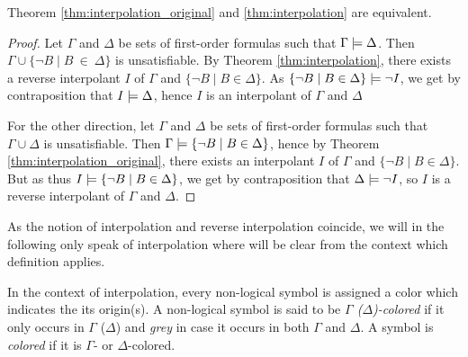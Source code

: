 \begin{prop}
	Theorem \ref{thm:interpolation_original} and \ref{thm:interpolation} are equivalent.
	\label{prop:interpolations_equivalent}
\end{prop}
\begin{proof}
	Let $\Gamma$ and $\Delta$ be sets of first-order formulas such that $ \Gamma \models \Delta$.
	Then $\Gamma \cup \{\lnot B \mid B~\in~\Delta\}$ is unsatisfiable.
	By Theorem \ref{thm:interpolation}, there exists a reverse interpolant $I$ of $\Gamma$ and $\{\lnot B \mid B \in \Delta\}$.
	As $\{\lnot B \mid B \in \Delta\} \models \lnot I$, we get by contraposition that $I \models \Delta$, hence $I$ is an interpolant of $\Gamma$ and $\Delta$

	For the other direction,
	let $\Gamma$ and $\Delta$ be sets of first-order formulas such that $ \Gamma \cup \Delta$ is unsatisfiable.
	Then $\Gamma \models \{\lnot B \mid B \in \Delta\}$, hence by Theorem \ref{thm:interpolation_original}, there exists an interpolant $I$ of $\Gamma$ and $\{\lnot B \mid B \in \Delta\}$.
	But as thus $ I\models \{\lnot B \mid B \in \Delta\}$, we get by contraposition that $\Delta \models \lnot I$, so $I$ is a reverse interpolant of $\Gamma$ and $\Delta$.
\end{proof}

As the notion of interpolation and reverse interpolation coincide, we will in the following only speak of interpolation where  will be clear from the context which definition applies.

In the context of interpolation, every non-logical symbol is assigned a color which indicates the its origin(s). 
A non-logical symbol is said to be \emph{$\Gamma$ ($\Delta$)-colored} if it only occurs in $\Gamma$ ($\Delta$) and \emph{grey} in case it occurs in both $\Gamma$ and $\Delta$. A symbol is \emph{colored} if it is $\Gamma$- or $\Delta$-colored.

